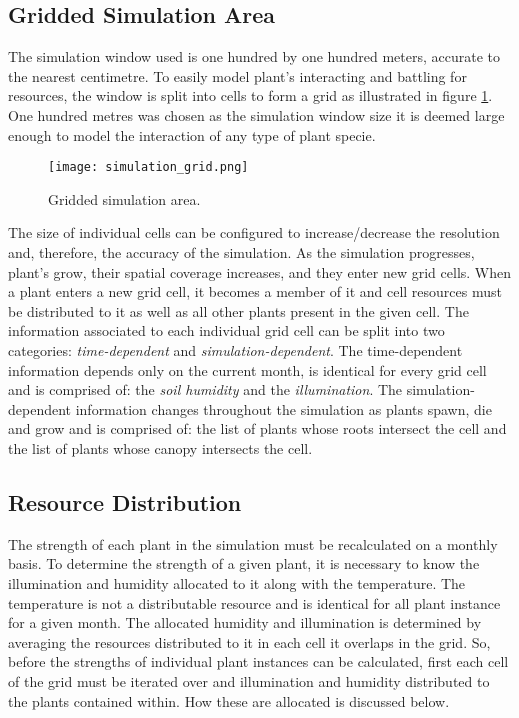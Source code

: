 \subsection{Gridded Simulation Area}

The simulation window used is one hundred by one hundred meters, accurate to the nearest centimetre. To easily model plant's interacting and battling for resources, the window is split into cells to form a grid as illustrated in figure \ref{fig:simulation_grid}. One hundred metres was chosen as the simulation window size it is deemed large enough to model the interaction of any type of plant specie.

\begin{figure}
\center
	\texttt{[image: simulation\_grid.png]}
	\caption{ Gridded simulation area.}	
	\label{fig:simulation_grid}
\end{figure}

The size of individual cells can be configured to increase/decrease the resolution and, therefore, the accuracy of the simulation. As the simulation progresses, plant's grow, their spatial coverage increases, and they enter new grid cells. When a plant enters a new grid cell, it becomes a member of it and cell resources must be distributed to it as well as all other plants present in the given cell. The information associated to each individual grid cell can be split into two categories: \textit{time-dependent} and \textit{simulation-dependent}. The time-dependent information depends only on the current month, is identical for every grid cell and is comprised of: the \textit{soil humidity} and the \textit{illumination}. The simulation-dependent information changes throughout the simulation as plants spawn, die and grow and is comprised of: the list of plants whose roots intersect the cell and the list of plants whose canopy intersects the cell.

\subsection{Resource Distribution}

The strength of each plant in the simulation must be recalculated on a monthly basis. To determine the strength of a given plant, it is necessary to know the illumination and humidity allocated to it along with the temperature. The temperature is not a distributable resource and is identical for all plant instance for a given month. The allocated humidity and illumination is determined by averaging the resources distributed to it in each cell it overlaps in the grid. So, before the strengths of individual plant instances can be calculated, first each cell of the grid must be iterated over and illumination and humidity distributed to the plants contained within. How these are allocated is discussed below.

